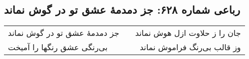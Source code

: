 \begin{center}
\section*{رباعی شماره ۶۲۸: جز دمدمهٔ عشق تو در گوش نماند}
\label{sec:0628}
\begin{longtable}{l p{0.5cm} r}
جز دمدمهٔ عشق تو در گوش نماند
&&
جان را ز حلاوت ازل هوش نماند
\\
بی‌رنگی عشق رنگها را آمیخت
&&
وز قالب بی‌رنگ فراموش نماند
\\
\end{longtable}
\end{center}
